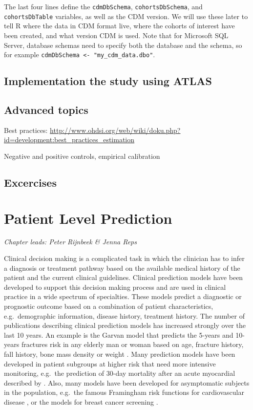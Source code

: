 \documentclass[]{book}
\begin{document}
The last four lines define the \texttt{cdmDbSchema},
\texttt{cohortsDbSchema}, and \texttt{cohortsDbTable} variables, as well
as the CDM version. We will use these later to tell R where the data in
CDM format live, where the cohorts of interest have been created, and
what version CDM is used. Note that for Microsoft SQL Server, database
schemas need to specify both the database and the schema, so for example
\texttt{cdmDbSchema\ \textless{}-\ "my\_cdm\_data.dbo"}.

\section{Implementation the study using
ATLAS}\label{implementation-the-study-using-atlas}

\section{Advanced topics}\label{advanced-topics}

Best practices:
\url{http://www.ohdsi.org/web/wiki/doku.php?id=development:best_practices_estimation}

Negative and positive controls, empirical calibration

\section{Excercises}\label{excercises}

\chapter{Patient Level Prediction}\label{PatientLevelPrediction}

\emph{Chapter leads: Peter Rijnbeek \& Jenna Reps}

Clinical decision making is a complicated task in which the clinician
has to infer a diagnosis or treatment pathway based on the available
medical history of the patient and the current clinical guidelines.
Clinical prediction models have been developed to support this decision
making process and are used in clinical practice in a wide spectrum of
specialties. These models predict a diagnostic or prognostic outcome
based on a combination of patient characteristics, e.g.~demographic
information, disease history, treatment history. The number of
publications describing clinical prediction models has increased
strongly over the last 10 years. An example is the Garvan model that
predicts the 5-years and 10-years fractures risk in any elderly man or
woman based on age, fracture history, fall history, bone mass density or
weight \citep{nguyen2008}. Many prediction models have been developed in
patient subgroups at higher risk that need more intensive monitoring,
e.g.~the prediction of 30-day mortality after an acute myocardial
described by \citet{lee1995}. Also, many models have been developed for
asymptomatic subjects in the population, e.g.~the famous Framingham risk
functions for cardiovascular disease \citep{wilson1998}, or the models
for breast cancer screening \citep{engel2015}.
\end{document}
